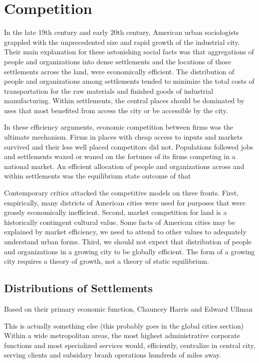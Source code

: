 \section*{Competition} 
In the late 19th century and early 20th century, American urban
sociologists grappled with the unprecedented size and rapid growth of
the industrial city. Their main explanation for these astonishing
social facts was that aggregations of people and organizations into
dense settlements and the locations of those settlements across the
land, were economically efficient. The distribution of people and
organizations among settlements tended to minimize the total costs of
transportation for the raw materials and finished goods of industrial
manufacturing. Within settlements, the central places should be
dominated by uses that most benefited from access the city or be
accessible by the city.

In these efficiency arguments, economic competition between firms was
the ultimate mechanism. Firms in places with cheap access to inputs
and markets survived and their less well placed competitors did
not. Populations followed jobs and settlements waxed or waned on the
fortunes of its firms competing in a national market.  An efficient
allocation of people and organizations across and within settlements
was the equilibrium state outcome of that 

Contemporary critics attacked the competitive models on three
fronts. First, empirically, many districts of American cities were
used for purposes that were grossly economically inefficient. Second,
market competition for land is a historically contingent cultural
value. Some facts of American cities may be explained by market
efficiency, we need to attend to other values to adequately understand
urban forms. Third, we should not expect that distribution of people
and organizations in a growing city to be globally efficient. The form
of a growing city requires a theory of growth, not a theory of static
equilibrium. 

\subsection*{Distributions of Settlements}
Based on their primary economic function, Chauncey Harris and Edward
Ullman 




This is actually something else (this probably goes in the global
cities section)
Within a wide
metropolitan areas, the most highest administrative corporate
functions and most specialized services would, efficiently, centralize
in central city, serving clients and subsidary branh operations
hundreds of miles away.







